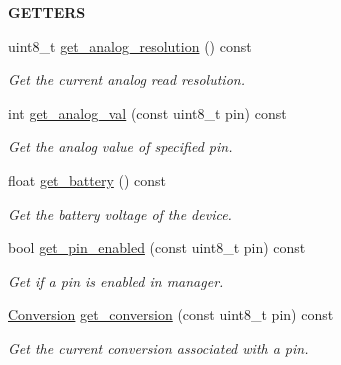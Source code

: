 \begin{Indent}{\bf G\+E\+T\+T\+E\+RS}\par
\begin{DoxyCompactItemize}
\item 
uint8\+\_\+t \hyperlink{class_loom___analog_ab5f411c342780111457c64234b4d643a}{get\+\_\+analog\+\_\+resolution} () const 
\begin{DoxyCompactList}\small\item\em Get the current analog read resolution. \end{DoxyCompactList}\item 
int \hyperlink{class_loom___analog_a8e908b2ba222b3d4f62c7f7e329cbe8e}{get\+\_\+analog\+\_\+val} (const uint8\+\_\+t pin) const 
\begin{DoxyCompactList}\small\item\em Get the analog value of specified pin. \end{DoxyCompactList}\item 
float \hyperlink{class_loom___analog_aa92ebd0ecbf15bc6a4a48b60d7d86b7b}{get\+\_\+battery} () const 
\begin{DoxyCompactList}\small\item\em Get the battery voltage of the device. \end{DoxyCompactList}\item 
bool \hyperlink{class_loom___analog_adfbd651535167726deffc2c033f0b725}{get\+\_\+pin\+\_\+enabled} (const uint8\+\_\+t pin) const 
\begin{DoxyCompactList}\small\item\em Get if a pin is enabled in manager. \end{DoxyCompactList}\item 
\hyperlink{class_loom___analog_a83079adfd115a272351323429cefad46}{Conversion} \hyperlink{class_loom___analog_ac8ac33bb528a34b34c389bb2debfe1e7}{get\+\_\+conversion} (const uint8\+\_\+t pin) const 
\begin{DoxyCompactList}\small\item\em Get the current conversion associated with a pin. \end{DoxyCompactList}\end{DoxyCompactItemize}
\end{Indent}
